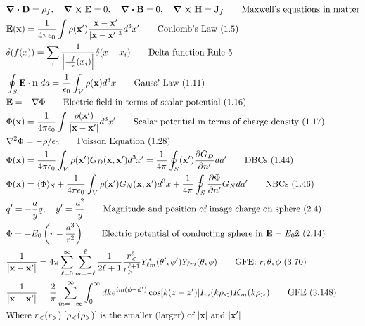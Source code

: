 \documentclass[10pt]{article}
\newcommand{\zhat}{\boldsymbol{\hat{\textbf{z}}}}
\newcommand{\ve}[1]{\boldsymbol{\mathbf{#1}}}
\newcommand{\vect}[1]{\boldsymbol{\mathbf{#1}}}
\newcommand{\vc}[1]{\mathbf{#1}}
\newcommand{\dd}{\, \mathrm{d}}
\newcommand{\eo}{\epsilon_0}
\newcommand{\tder}[2]{\frac{\dd #1}{\dd #2}}
\newcommand{\pder}[2]{\frac{\partial #1}{\partial #2}}
\newcommand{\K}{\frac{1}{4 \pi \eo}}
\begin{document}
\begin{multicols}{2}
	\tiny
	\setlength{\abovedisplayskip}{-25pt}
	\setlength{\belowdisplayskip}{0pt}
	\setlength{\abovedisplayshortskip}{0pt}
	\begin{align*}
		& \ve{\nabla \cdot D} = \rho_f, \quad \ve{\nabla \times E} = 0, \quad \ve{\nabla \cdot B} = 0, \quad \ve{\nabla \times H} = \ve{J}_f \tag*{Maxwell's equations in matter} \\
		& \vect{E}(\vect{x}) = \frac{1}{4 \pi \eo} \int \rho(\vect{x}') \frac{\vect{x} - \vect{x}'}{|\vect{x} - \vect{x}'|^3} d^3x' \tag*{Coulomb's Law (1.5)} \\
		& \delta(f(x)) = \sum_{i} \frac{1}{\left|\tder{f}{x}(x_i)\right|}\delta(x - x_i)	\tag*{Delta function Rule 5 } \\
		& \oint_S \vc{E} \cdot \vc{n} \; da = \frac{1}{\eo} \int_V \rho(\vc{x}) d^3x	\tag*{Gauss' Law (1.11)} \\
		& \vc{E} = -\vc{\nabla} \Phi	\tag*{Electric field in terms of scalar potential (1.16)} \\
		& \Phi(\vc{x}) = \K \int \frac{\rho (\vc{x}')}{|\vc{x} - \vc{x}'|} d^3 x' \tag*{Scalar potential in terms of charge density (1.17)} \\
		& \nabla^2 \Phi = -\rho/\eo	\tag*{Poisson Equation (1.28)} \\
		& \Phi(\vc{x}) = \K \int_V \rho(\vc{x}') G_D(\vc{x}, \vc{x}') d^3x' = \frac{1}{4 \pi} \oint_S(\vc{x}') \pder{G_D}{n'} da'	\tag*{DBCs (1.44)} \\
		& \Phi(\vc{x}) = \langle\Phi\rangle_S + \K \int_V \rho(\vc{x}') G_N(\vc{x},\vc{x}') d^3x + \frac{1}{4 \pi} \oint_S \pder{\Phi}{n'} G_N da'	\tag*{NBCs (1.46)} \\
		& q' = -\frac{a}{y} q, \quad y' = \frac{a^2}{y}		\tag*{Magnitude and position of image charge on sphere (2.4)} \\
		& \Phi = -E_0 \left( r - \frac{a^3}{r^2} \right)	\tag*{Electric potential of conducting sphere in $\vect{E} = E_0 \zhat$ (2.14)} \\
		& \frac{1}{|\vc{x} - \vc{x}'|} = 4 \pi \sum_{\ell = 0}^\infty \sum_{m = -\ell}^{\ell} \frac{1}{2 \ell +1} \frac{r_<^\ell}{r_>^{\ell +1}} Y_{\ell m}^*(\theta', \phi') Y_{\ell m}(\theta,\phi)	\tag*{GFE: $r,\theta,\phi$ (3.70)} \\
		& \frac{1}{|\ve{x} - \ve{x}'|} = \frac{2}{\pi} \sum_{m=-\infty}^{\infty} \int_0^\infty dk e^{im(\phi - \phi')} \cos[k(z-z')] I_m(k\rho_<) K_m(k \rho_>) \tag*{GFE (3.148)} \\
		&\text{Where $r_< (r_>) \; [\rho_< (\rho_>)]$ is the smaller (larger) of $|\vc{x}|$ and $|\vc{x}'|$} \\

\end{align*}
\end{multicols}
\end{document}
